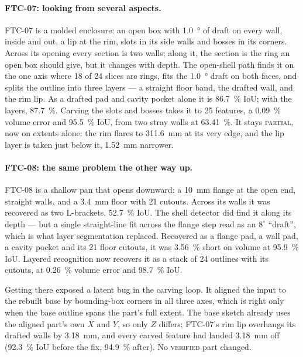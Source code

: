 \documentclass[11pt]{article}
\newcommand{\VERIFIED}{\textsc{verified}}
\newcommand{\PARTIAL}{\textsc{partial}}
\begin{document}
\paragraph{FTC-07: looking from several aspects.} FTC-07 is a molded
enclosure: an open box with \SI{1.0}{\degree} of draft on every wall, inside and
out, a lip at the rim, slots in its side walls and bosses in its corners.
Across its opening every section is two walls; along it, the section is the
ring an open box should give, but it changes with depth. The open-shell path
finds it on the one axis where 18 of 24 slices are rings, fits the
\SI{1.0}{\degree} draft on both faces, and splits the outline into three layers
--- a straight floor band, the drafted wall, and the rim lip. As a drafted pad
and cavity pocket alone it is \SI{86.7}{\percent} IoU; with the layers,
\SI{87.7}{\percent}. Carving the slots and bosses takes it to 25 features, a
\SI{0.09}{\percent} volume error and \SI{95.5}{\percent} IoU, from two stray walls
at \SI{63.41}{\percent}. It stays \PARTIAL{}, now on extents alone: the rim flares
to \SI{311.6}{\milli\metre} at its very edge, and the lip layer is taken just below
it, \SI{1.52}{\milli\metre} narrower.

\paragraph{FTC-08: the same problem the other way up.} FTC-08 is a shallow pan
that opens downward: a \SI{10}{\milli\metre} flange at the open end, straight
walls, and a \SI{3.4}{\milli\metre} floor with 21 cutouts. Across its walls it was
recovered as two L-brackets, \SI{52.7}{\percent} IoU. The shell detector did
find it along its depth --- but a single straight-line fit across the flange
step read as an $8^\circ$ ``draft'', which is what layer segmentation replaced.
Recovered as a flange pad, a wall pad, a cavity pocket and its 21 floor cutouts,
it was \SI{3.56}{\percent} short on volume at \SI{95.9}{\percent} IoU. Layered
recognition now recovers it as a stack of 24 outlines with its cutouts, at
\SI{0.26}{\percent} volume error and \SI{98.7}{\percent} IoU.

Getting there exposed a latent bug in the carving loop. It aligned the input to
the rebuilt base by bounding-box corners in all three axes, which is right only
when the base outline spans the part's full extent. The base sketch already uses
the aligned part's own $X$ and $Y$, so only $Z$ differs; FTC-07's rim lip
overhangs its drafted walls by \SI{3.18}{\milli\metre}, and every carved feature
had landed \SI{3.18}{\milli\metre} off (\SI{92.3}{\percent} IoU before the fix,
\SI{94.9}{\percent} after). No \VERIFIED{} part changed.
\end{document}
